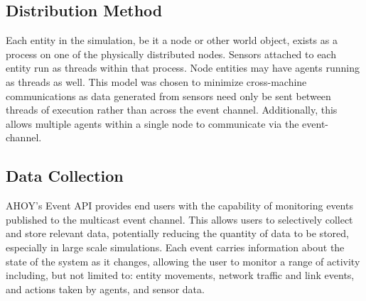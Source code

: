 \documentclass[conference]{IEEEtran}
\begin{document}
\subsection{Distribution Method}
Each entity in the simulation, be it a node or other world object, exists as a process on one of the physically distributed nodes. Sensors attached to each entity run as threads within that process. Node entities may have agents running as threads as well. This model was chosen to minimize cross-machine communications as data generated from sensors need only be sent between threads of execution rather than across the event channel. Additionally, this allows multiple agents within a single node to communicate via the event-channel. 

\subsection{Data Collection}
AHOY's Event API provides end users with the capability of monitoring events published to the multicast event channel. This allows users to selectively collect and store relevant data, potentially reducing the quantity of data to be stored, especially in large scale simulations. Each event carries information about the state of the system as it changes, allowing the user to monitor a range of activity including, but not limited to: entity movements, network traffic and link events, and actions taken by agents, and sensor data. 
\end{document}
